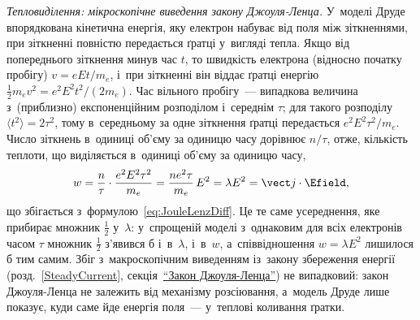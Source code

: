 \emph{Тепловиділення: мікроскопічне виведення закону Джоуля-Ленца.} У~моделі Друде
впорядкована кінетична енергія, яку електрон набуває від поля між зіткненнями, при
зіткненні повністю передається ґратці у~вигляді тепла. Якщо від попереднього зіткнення
минув час $t$, то швидкість електрона (відносно початку пробігу) $v=eEt/m_e$, і~при
зіткненні він віддає ґратці енергію $\tfrac12m_ev^2=e^2E^2t^2/(2m_e)$. Час вільного
пробігу~--- випадкова величина з~(приблизно) експоненційним розподілом і~середнім $\tau$;
для такого розподілу $\langle t^2\rangle=2\tau^2$, тому в~середньому за одне зіткнення
ґратці передається $e^2E^2\tau^2/m_e$. Число зіткнень в~одиниці об'єму за одиницю часу
дорівнює $n/\tau$, отже, кількість теплоти, що виділяється в~одиниці об'єму за одиницю
часу,
\begin{equation*}
	w=\frac n\tau\cdot\frac{e^2E^2\tau^2}{m_e}=\frac{ne^2\tau}{m_e}\,E^2=\lambda E^2=\vect j\cdot\Efield,
\end{equation*}
що збігається з~формулою~\eqref{eq:JouleLenzDiff}. Це те саме усереднення, яке прибирає
множник $\tfrac12$ у~$\lambda$: у~спрощеній моделі з~однаковим для всіх електронів часом
$\tau$ множник $\tfrac12$ з'явився б і~в~$\lambda$, і~в~$w$, а~співвідношення $w=\lambda
E^2$ лишилося б тим самим. Збіг з~макроскопічним виведенням із~закону збереження енергії
(розд.~\ref{SteadyCurrent}, секція~\hyperlink{joule-lenz-law}{\enquote{Закон
Джоуля-Ленца}}) не випадковий: закон Джоуля-Ленца не залежить від механізму розсіювання,
а~модель Друде лише показує, куди саме йде енергія поля~--- у~теплові коливання ґратки.

